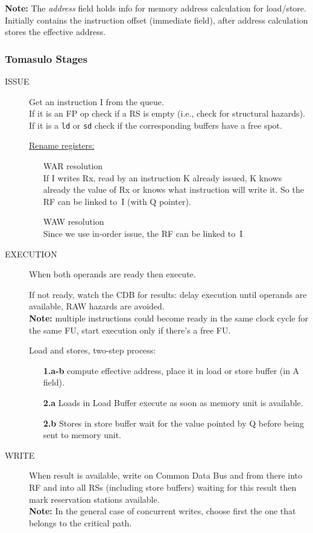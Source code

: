 \textbf{Note:} The \textit{address} field holds info for memory address calculation for load/store.
Initially contains the instruction offset (immediate field), after address calculation stores the effective address.

\subsubsection{Tomasulo Stages}
\begin{description}
    \item[ISSUE] Get an instruction I from the queue.\\
    If it is an FP op check if a RS is empty (i.e., check for structural hazards).\\
    If it is a \verb|ld| or \verb|sd| check if the corresponding buffers have a free spot.

    \underline{Rename registers:}
    \begin{itemize}
        \item[\textrightarrow] WAR resolution\\
    If I writes Rx, read by an instruction K already issued, K
    knows already the value of Rx or knows what instruction
    will write it.
    So the RF can be linked to~I (with Q pointer).
        \item[\textrightarrow] WAW resolution\\
    Since we use in-order issue, the RF can be linked to~I
    \end{itemize}

    \item[EXECUTION] When both operands are ready then execute.

    If not ready, watch the CDB for results: delay execution until operands are available, RAW
    hazards are avoided.\\
    \textbf{Note:} multiple instructions could become ready in the
    same clock cycle for the same FU, start execution only if there's a free FU\@.

    Load and stores, two-step process:
    \begin{itemize}[noitemsep]
        \item[\textbf{1.a-b}] compute effective address, place it in load or
        store buffer (in A field).
        \item[\textbf{2.a}] Loads in Load Buffer execute as soon as memory unit is
    available.
        \item[\textbf{2.b}] Stores in store buffer wait for the value pointed by Q before
    being sent to memory unit.
    \end{itemize}

    \item[WRITE] When result is available, write on Common Data Bus and from there into RF and into all RSs
    (including store buffers) waiting for this result then mark reservation stations available.\\
    \textbf{Note:} In the general case of concurrent writes, choose first the one that belongs to the critical path.
\end{description}


